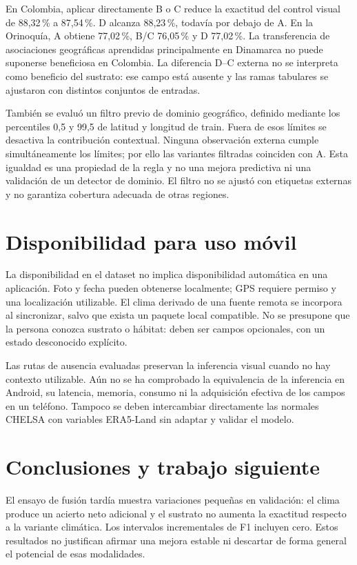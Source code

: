 \documentclass[11pt,a4paper]{article}
\begin{document}
En Colombia, aplicar directamente B o C reduce la exactitud del control
visual de 88,32\,\% a 87,54\,\%. D alcanza 88,23\,\%, todavía por debajo de A.
En la Orinoquía, A obtiene 77,02\,\%, B/C 76,05\,\% y D 77,02\,\%.
La transferencia de asociaciones geográficas aprendidas principalmente en
Dinamarca no puede suponerse beneficiosa en Colombia. La diferencia D--C
externa no se interpreta como beneficio del sustrato: ese campo está ausente y
las ramas tabulares se ajustaron con distintos conjuntos de entradas.

También se evaluó un filtro previo de dominio geográfico, definido mediante
los percentiles 0,5 y 99,5 de latitud y longitud de train. Fuera de esos límites
se desactiva la contribución contextual. Ninguna observación externa cumple
simultáneamente los límites; por ello las variantes filtradas coinciden con A.
Esta igualdad es una propiedad de la regla y no una mejora predictiva ni una
validación de un detector de dominio. El filtro no se ajustó con etiquetas
externas y no garantiza cobertura adecuada de otras regiones.

\section{Disponibilidad para uso móvil}
La disponibilidad en el dataset no implica disponibilidad automática en una
aplicación. Foto y fecha pueden obtenerse localmente; GPS requiere permiso y
una localización utilizable. El clima derivado de una fuente remota se
incorpora al sincronizar, salvo que exista un paquete local compatible. No se
presupone que la persona conozca sustrato o hábitat: deben ser campos opcionales,
con un estado desconocido explícito.

Las rutas de ausencia evaluadas preservan la inferencia visual cuando no hay
contexto utilizable. Aún no se ha comprobado la equivalencia de la inferencia
en Android, su latencia, memoria, consumo ni la adquisición efectiva de los
campos en un teléfono. Tampoco se deben intercambiar directamente las
normales CHELSA con variables ERA5-Land sin adaptar y validar el modelo.

\section{Conclusiones y trabajo siguiente}
El ensayo de fusión tardía muestra variaciones pequeñas en validación: el
clima produce un acierto neto adicional y el sustrato no aumenta la exactitud
respecto a la variante climática. Los intervalos incrementales de F1 incluyen
cero. Estos resultados no justifican afirmar una mejora estable ni descartar
de forma general el potencial de esas modalidades.
\end{document}
